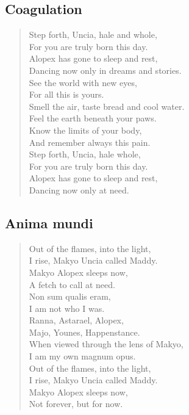 \subsection{Coagulation}

\begin{verse}
Step forth, Uncia, hale and whole,\\
\vin For you are truly born this day.\\
Alopex has gone to sleep and rest,\\
\vin Dancing now only in dreams and stories.\\
See the world with new eyes,\\
\vin For all this is yours.\\
Smell the air, taste bread and cool water.\\
\vin Feel the earth beneath your paws.\\
Know the limits of your body,\\
\vin And remember always this pain.\\
Step forth, Uncia, hale whole,\\
\vin For you are truly born this day.\\
Alopex has gone to sleep and rest,\\
\vin Dancing now only at need.\\
\end{verse}
\newpage

\subsection{Anima mundi}

\begin{verse}
Out of the flames, into the light,\\
\vin I rise, Makyo Uncia called Maddy.\\
Makyo Alopex sleeps now,\\
\vin A fetch to call at need.\\
Non sum qualis eram,\\
\vin I am not who I was.\\
Ranna, Astarael, Alopex,\\
\vin Majo, Younes, Happenstance.\\
When viewed through the lens of Makyo,\\
\vin I am my own magnum opus.\\
Out of the flames, into the light,\\
\vin I rise, Makyo Uncia called Maddy.\\
Makyo Alopex sleeps now,\\
\vin Not forever, but for now.
\end{verse}
